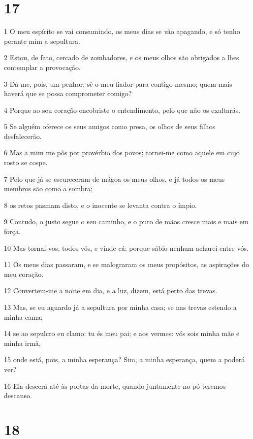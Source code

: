 \chapter{17}

\par 1 O meu espírito se vai consumindo, os meus dias se vão apagando, e só tenho perante mim a sepultura.
\par 2 Estou, de fato, cercado de zombadores, e os meus olhos são obrigados a lhes contemplar a provocação.
\par 3 Dá-me, pois, um penhor; sê o meu fiador para contigo mesmo; quem mais haverá que se possa comprometer comigo?
\par 4 Porque ao seu coração encobriste o entendimento, pelo que não os exaltarás.
\par 5 Se alguém oferece os seus amigos como presa, os olhos de seus filhos desfalecerão.
\par 6 Mas a mim me pôs por provérbio dos povos; tornei-me como aquele em cujo rosto se cospe.
\par 7 Pelo que já se escureceram de mágoa os meus olhos, e já todos os meus membros são como a sombra;
\par 8 os retos pasmam disto, e o inocente se levanta contra o ímpio.
\par 9 Contudo, o justo segue o seu caminho, e o puro de mãos cresce mais e mais em força.
\par 10 Mas tornai-vos, todos vós, e vinde cá; porque sábio nenhum acharei entre vós.
\par 11 Os meus dias passaram, e se malograram os meus propósitos, as aspirações do meu coração.
\par 12 Convertem-me a noite em dia, e a luz, dizem, está perto das trevas.
\par 13 Mas, se eu aguardo já a sepultura por minha casa; se nas trevas estendo a minha cama;
\par 14 se ao sepulcro eu clamo: tu és meu pai; e aos vermes: vós sois minha mãe e minha irmã,
\par 15 onde está, pois, a minha esperança? Sim, a minha esperança, quem a poderá ver?
\par 16 Ela descerá até às portas da morte, quando juntamente no pó teremos descanso.

\chapter{18}


